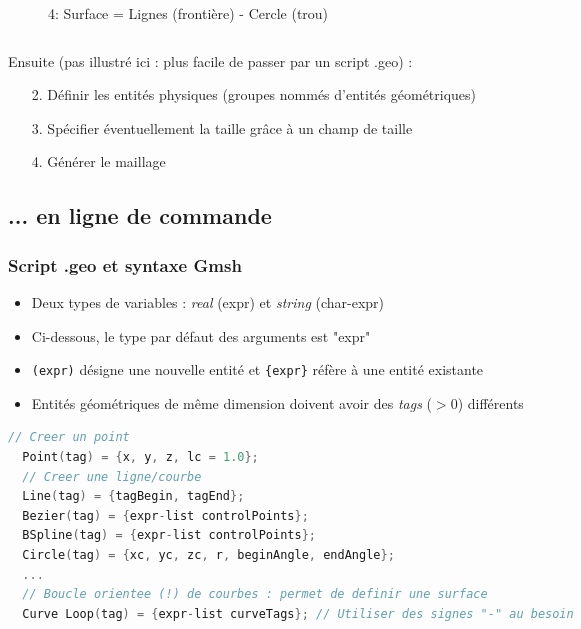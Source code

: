 \documentclass[aspectratio=169]{beamer}
\begin{document}
\begin{frame}[fragile]
\begin{columns}
\begin{column}{0.5\textwidth}
\begin{figure}
      \caption{4: Surface = Lignes (frontière) - Cercle (trou)}
    \end{figure}
  \end{column}
\end{columns}
\footnotesize
Ensuite (pas illustré ici : plus facile de passer par un script .geo) :
\begin{enumerate}
  \item[2.] Définir les entités physiques (groupes nommés d'entités géométriques)
  \item[3.] Spécifier éventuellement la taille grâce à un champ de taille
  \item[4.] Générer le maillage
\end{enumerate}

\end{frame}

\subsection{... en ligne de commande}

\begin{frame}[fragile]
\frametitle{Script .geo et syntaxe Gmsh}
\begin{itemize}
  \item Deux types de variables : \textit{real} (expr) et \textit{string} (char-expr)
  \item Ci-dessous, le type par défaut des arguments est "expr"
  \item \texttt{(expr)} désigne une nouvelle entité et \texttt{\{expr\}} réfère à une entité existante
  \item Entités géométriques de même dimension doivent avoir des \textit{tags} ($>0$) différents
\end{itemize}
\begin{lstlisting}[language=c++]
  // Creer un point
  Point(tag) = {x, y, z, lc = 1.0};
  // Creer une ligne/courbe
  Line(tag) = {tagBegin, tagEnd};
  Bezier(tag) = {expr-list controlPoints};
  BSpline(tag) = {expr-list controlPoints};
  Circle(tag) = {xc, yc, zc, r, beginAngle, endAngle};
  ...
  // Boucle orientee (!) de courbes : permet de definir une surface
  Curve Loop(tag) = {expr-list curveTags}; // Utiliser des signes "-" au besoin
\end{lstlisting}
\end{frame}
\end{document}

